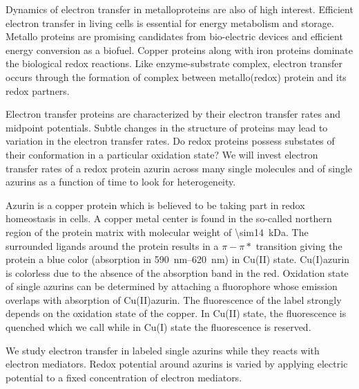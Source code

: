 Dynamics of electron transfer in metalloproteins are also of high interest.\cite{marcus1985electron,dooley1981spectroscopic} Efficient electron transfer in living cells is essential for energy metabolism and storage. Metallo proteins are promising candidates from bio-electric devices and efficient energy conversion as a biofuel. Copper proteins along with iron proteins dominate the biological redox reactions. \cite{solomon2004electronic,solomon2001oxygen,peisach1974structural,canters1993engineering} 
Like enzyme-substrate complex, electron transfer occurs through the formation of complex between metallo(redox) protein and its redox partners. 

Electron transfer proteins are characterized by their electron transfer rates and midpoint potentials. Subtle changes in the structure of proteins may lead to variation in the electron transfer rates. Do redox proteins possess substates of their conformation in a particular oxidation state? We will invest electron transfer rates of a redox protein azurin across many single molecules and of single azurins as a function of time to look for heterogeneity.

Azurin is a copper protein which is believed to be taking part in redox homeostasis in cells. A copper metal center is found in the so-called northern region of the protein matrix with molecular weight of \SI{\sim14}{\kilo\dalton}. The surrounded ligands around the protein results in a $\pi-\pi*$ transition giving the protein a blue color (absorption in \SIrange{590}{620}{\nm}) in Cu(II) state. Cu(I)azurin is colorless due to the absence of the absorption band in the red. Oxidation state of single azurins can be determined by attaching a fluorophore whose emission overlaps with absorption of Cu(II)azurin.\cite{kuznetsova2006a,kuznetsova2008the}
The fluorescence of the label strongly depends on the oxidation state of the copper. In Cu(II) state, the fluorescence is quenched which we call while in Cu(I) state the fluorescence is reserved.

We study electron transfer in labeled single azurins while they reacts with electron mediators. Redox potential around azurins is varied by applying electric potential to a fixed concentration of electron mediators. 

